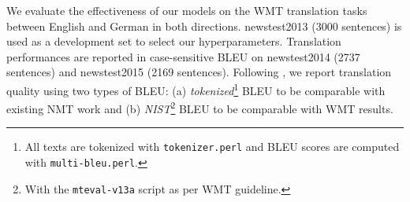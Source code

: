We evaluate the effectiveness of our models on the WMT translation tasks between
English and German in both directions. newstest2013 (3000 sentences) is used as
a development set to select our hyperparameters. Translation performances are
reported in case-sensitive BLEU \cite{Papineni02bleu} on newstest2014 (2737 sentences) and
newstest2015 (2169 sentences). Following \cite{luong15}, we report
translation quality using two types of BLEU: (a) {\it
tokenized}\footnote{All texts are tokenized with \texttt{tokenizer.perl} and BLEU
scores are computed with \texttt{multi-bleu.perl}.} BLEU to be comparable with
existing NMT work and (b) {\it NIST}\footnote{With the \texttt{mteval-v13a}
script as per WMT guideline.} BLEU to be comparable
with WMT results.

\begin{table*}[tbh!]
\centering
{}
\caption[WMT'14 English-German results]{{\bf WMT'14 English-German results} -- shown are
the perplexities (ppl) and the {\it tokenized} BLEU scores of various systems on newstest2014. We highlight the {\bf
best} system in bold and give {\it progressive} improvements in italic between
consecutive systems. {\it local-p} referes to the local attention with 
predictive alignments. We indicate for each attention model the
alignment score function used in pararentheses. 
}
\label{t:ende}
\end{table*}


